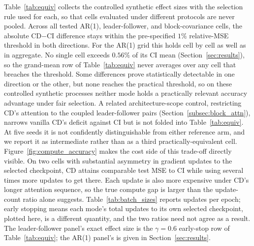 \documentclass[10pt]{article} %
\begin{document}
    Table~\ref{tab:equiv} collects the controlled synthetic effect sizes with the selection rule used for each, so that
    cells evaluated under different protocols are never pooled. Across all tested AR(1), leader-follower, and block-covariance
    cells, the absolute CD$-$CI difference stays within the pre-specified $1\%$ relative-MSE threshold in both directions.
    For the AR(1) grid this holds cell by cell as well as in aggregate. No single cell exceeds $0.56\%$ of its CI mean
    (Section~\ref{sec:results}), so the grand-mean row of Table~\ref{tab:equiv} never averages over any cell that breaches
    the threshold. Some differences prove statistically detectable in one direction or the other, but none reaches the
    practical threshold, so on these controlled synthetic processes neither mode holds a practically relevant accuracy
    advantage under fair selection. A related architecture-scope control, restricting CD's attention to the coupled
    leader-follower pairs (Section~\ref{subsec:block_attn}), narrows vanilla CD's deficit against CI but is not folded into
    Table~\ref{tab:equiv}. At five seeds it is not confidently distinguishable from either reference arm, and we report
    it as intermediate rather than as a third practically-equivalent cell. Figure~\ref{fig:compute_accuracy} makes the cost
    side of this trade-off directly visible. On two cells with substantial asymmetry in gradient updates to the selected
    checkpoint, CD attains comparable test MSE to CI while using several times more updates to get there. Each update is
    also more expensive under CD's longer attention sequence, so the true compute gap is larger than the update-count ratio
    alone suggests. Table~\ref{tab:batch_sizes} reports updates per epoch; early stopping means each mode's total updates
    to its own selected checkpoint, plotted here, is a different quantity, and the two ratios need not agree as a result.
    The leader-follower panel's exact effect size is the $\gamma = 0.6$ early-stop row of Table~\ref{tab:equiv}; the AR(1)
    panel's is given in Section~\ref{sec:results}.
\end{document}
